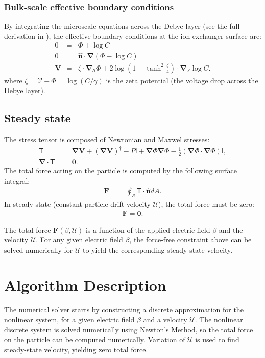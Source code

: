 \documentclass[final]{elsarticle}
\newcommand{\pars}[1]{\left(#1\right)}
\newcommand\bnabla{\boldsymbol{\nabla}}
\newcommand\bV{\boldsymbol{V}}
\newcommand\bF{\boldsymbol{F}}
\newcommand\bnhat{\hat{\boldsymbol{n}}}
\newcommand\bzero{\boldsymbol{0}}
\newcommand\cU{\mathscr{U}}
\newcommand\cV{\mathscr{V}}
\newcommand\tI{\mathsf{I}}
\newcommand\tT{\mathsf{T}}
\begin{document}
\subsubsection{Bulk-scale effective boundary conditions}
By integrating the microscale equations across the Debye layer
(see the full derivation in \cite{yariv2010asymptotic}), 
the effective boundary conditions at the ion-exchanger surface are:
\begin{eqnarray*}
0 &=& \varPhi + \log C \\
0 &=& \bnhat \cdot \bnabla \pars{\varPhi - \log C} \\
\bV &=& 
\zeta \cdot \bnabla_\mathcal{S} \varPhi 
+ 2\log\pars{1-\tanh^2\frac{\zeta}{4}} \cdot \bnabla_\mathcal{S} \log C.
\end{eqnarray*}
where $\zeta = \cV - \varPhi = \log (C / \gamma)$ 
is the zeta potential (the voltage drop across the Debye layer).

\subsection{Steady state}
The stress tensor is composed of Newtonian and Maxwel stresses:
\begin{eqnarray*}
\tT &=& \bnabla \bV + (\bnabla \bV)^\dagger - P \tI
+ \bnabla \varPhi \bnabla \varPhi - \frac{1}{2} (\bnabla \varPhi \cdot \bnabla \varPhi) \tI, \\
\bnabla \cdot \tT &=& \bzero.
\end{eqnarray*}
The total force acting on the particle is computed by the following surface integral:
\begin{eqnarray*}
\bF &=& \oint_\mathcal{S} \tT \cdot \bnhat dA.
\end{eqnarray*}
In steady state (constant particle drift velocity $\cU$), 
the total force must be zero: 
\begin{eqnarray*}
\bF = \bzero.
\end{eqnarray*}

The total force $\bF(\beta, \cU)$ is a function of the applied electric field $\beta$ and
the velocity $\cU$.
For any given electric field $\beta$, the force-free constraint above 
can be solved numerically for $\cU$ to yield the corresponding steady-state velocity.

\section{Algorithm Description} \label{sec:algorithm}
The numerical solver starts by constructing a discrete approximation for the nonlinear system,
for a given electric field $\beta$ and a velocity $\cU$. The nonlinear discrete system is
solved numerically using Newton's Method, so the total force on the particle can be computed
numerically. Variation of $\cU$ is used to find steady-state velocity, yielding zero total force.
\end{document}
